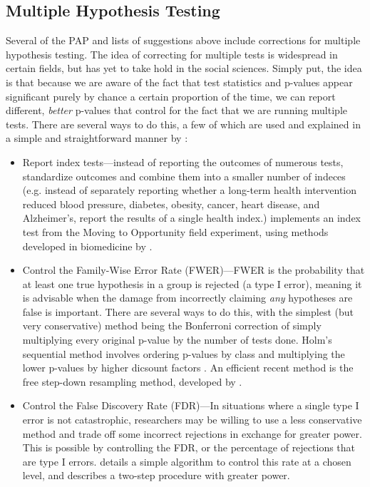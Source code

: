 \documentclass[12pt] {article}
\begin{document}
\subsection{Multiple Hypothesis Testing}
Several of the PAP and lists of suggestions above include corrections for multiple hypothesis testing. The idea of correcting for multiple tests is widespread in certain fields, but has yet to take hold in the social sciences. Simply put, the idea is that because we are aware of the fact that test statistics and p-values appear significant purely by chance a certain proportion of the time, we can report different, \textit{better} p-values that control for the fact that we are running multiple tests. There are several ways to do this, a few of which are used and explained in a simple and straightforward manner by \cite{anderson_fwer}:
\begin{itemize}
\item
Report index tests---instead of reporting the outcomes of numerous tests, standardize outcomes and combine them into a smaller number of indeces (e.g. instead of separately reporting whether a long-term health intervention reduced blood pressure, diabetes, obesity, cancer, heart disease, and Alzheimer's, report the results of a single health index.) \cite{kling2007experimental} implements an index test from the Moving to Opportunity field experiment, using methods developed in biomedicine by \cite{obrien1984procedures}.

\item
Control the Family-Wise Error Rate (FWER)---FWER is the probability that at least one true hypothesis in a group is rejected (a type I error), meaning it is advisable when the damage from incorrectly claiming \textit{any} hypotheses are false is important. There are several ways to do this, with the simplest (but very conservative) method being the Bonferroni correction of simply multiplying every original p-value by the number of tests done. Holm's sequential method involves ordering p-values by class and multiplying the lower p-values by higher dicsount factors \citep{holm_multipletesting}. An efficient recent method is the free step-down resampling method, developed by \cite{westfall_young_multiple}.
  
\item
Control the False Discovery Rate (FDR)---In situations where a single type I error is not catastrophic, researchers may be willing to use a less conservative method and trade off some incorrect rejections in exchange for greater power. This is possible by controlling the FDR, or the percentage of rejections that are type I errors. \cite{benjamini1995controlling} details a simple algorithm to control this rate at a chosen level, and \cite{benjamini2006adaptive} describes a two-step procedure with greater power. 


\end{itemize}
\end{document}
